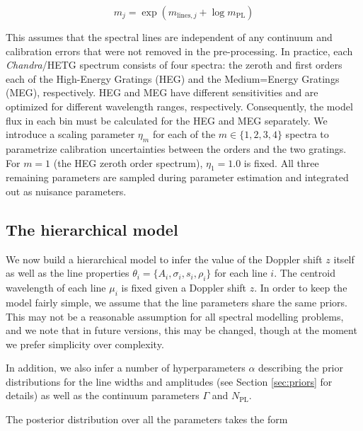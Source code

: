\documentclass[12pt]{emulateapj}
\newcommand{\project}[1]{\textsl{#1}}
\newcommand{\chandra}{\project{Chandra}}
\newcommand{\pars}{\theta}
\newcommand{\mean}{m}
\newcommand{\bkg}{\mathrm{bkg}}
\begin{document}
\begin{equation}
\label{eqn:modelflux}
m_j  = \exp{(m_{\mathrm{lines},j} + \log{m_{\mathrm{PL}}})} 
\end{equation}

\noindent This assumes that the spectral lines are independent of any continuum and calibration errors that were not removed in the pre-processing. 
In practice, each \chandra/HETG spectrum consists of four spectra: the zeroth and first orders each of the High-Energy Gratings (HEG) and the Medium=Energy Gratings (MEG), respectively. HEG and MEG have different sensitivities and are optimized for different wavelength ranges, respectively. Consequently, the model flux in each bin must be calculated for the HEG and MEG separately. We introduce a scaling parameter $\eta_m$ for each of the $m \in \{1, 2, 3, 4\}$ spectra to parametrize calibration uncertainties between the orders and the two gratings. For $m=1$ (the HEG zeroth order spectrum), $\eta_1 = 1.0$ is fixed. All three remaining parameters are sampled during parameter estimation and integrated out as nuisance parameters.



\subsection{The hierarchical model}
\label{sec:hierarchicalmodel}
We now build a hierarchical model to infer the value of the Doppler shift $z$ itself as well as the line properties ${\pars_{i}} = \{A_{i}, \sigma_{i}, s_{i}, \rho_{i}\}$ for each line $i$. The centroid wavelength of each line $\mu_i$ is fixed given a Doppler shift $z$. In order to keep the model fairly simple, we assume that the line parameters share the same priors. This may not be a reasonable assumption for all spectral modelling problems, and we note that in future versions, this may be changed, though at the moment we prefer simplicity over complexity. 

In addition, we also infer a number of hyperparameters $\alpha$ describing the prior distributions for the line widths and amplitudes (see Section \ref{sec:priors} for details) as well as the continuum parameters $\Gamma$ and $N_{\mathrm{PL}}$.%

The posterior distribution over all the parameters takes the form
\end{document}
